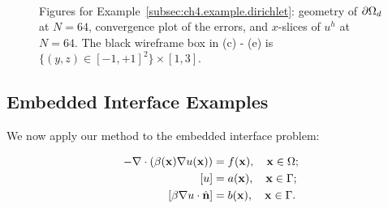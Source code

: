 \setlength{\figureheighti}{0.40\columnwidth}
\setlength{\figurewidthii}{0.32\columnwidth}
\begin{figure}[htbp]
\begin{center}
 \\
\caption{Figures for Example~\ref{subsec:ch4.example.dirichlet}: geometry of $\partial\Omega_d$ at $N = 64$, convergence plot of the errors, and $x$-slices of $u^h$ at $N = 64$. The black wireframe box in (c) - (e) is $\{(y,z) \in [-1,+1]^2\} \times [1,3]$.}
\label{fig:ch4.examples.dirichlet}
\end{center}
\end{figure}

\subsection{Embedded Interface Examples} \label{subsec:ch4.examples.interface}

We now apply our method to the embedded interface problem:

\begin{align*}
-\nabla \cdot \left( \beta(\mathbf{x}) \nabla u(\mathbf{x}) \right) & = f(\mathbf{x}), \quad \mathbf{x} \in \Omega; \\
\left[ u \right] & = a(\mathbf{x}), \quad \mathbf{x} \in \Gamma; \\
\left[ \beta \nabla u \cdot \hat{\mathbf{n}} \right] & = b(\mathbf{x}), \quad \mathbf{x} \in \Gamma.
\end{align*}

